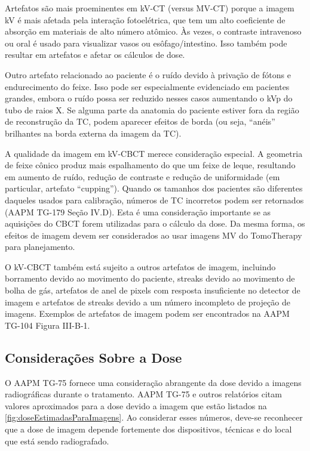 \documentclass[11pt,a4paper]{article}
\begin{document}
    Artefatos são mais proeminentes em kV-CT (versus MV-CT) porque a imagem kV é mais afetada pela interação fotoelétrica, que tem um alto coeficiente de absorção em materiais de alto número atômico. Às vezes, o contraste intravenoso ou oral é usado para visualizar vasos ou esôfago/intestino. Isso também pode resultar em artefatos e afetar os cálculos de dose. 
    
    Outro artefato relacionado ao paciente é o ruído devido à privação de fótons e endurecimento do feixe. Isso pode ser especialmente evidenciado em pacientes grandes, embora o ruído possa ser reduzido nesses casos aumentando o kVp do tubo de raios X. Se alguma parte da anatomia do paciente estiver fora da região de reconstrução da TC, podem aparecer efeitos de borda (ou seja, “anéis” brilhantes na borda externa da imagem da TC).

    A qualidade da imagem em kV-CBCT merece consideração especial. A geometria de feixe cônico produz mais espalhamento do que um feixe de leque, resultando em aumento de ruído, redução de contraste e redução de uniformidade (em particular, artefato “cupping”). Quando os tamanhos dos pacientes são diferentes daqueles usados para calibração, números de TC incorretos podem ser retornados (AAPM TG-179 Seção IV.D). Esta é uma consideração importante se as aquisições do CBCT forem utilizadas para o cálculo da dose. Da mesma forma, os efeitos de imagem devem ser considerados ao usar imagens MV do TomoTherapy para planejamento.

    O kV-CBCT também está sujeito a outros artefatos de imagem, incluindo borramento devido ao movimento do paciente, streaks devido ao movimento de bolha de gás, artefatos de anel de pixels com resposta insuficiente no detector de imagem e artefatos de streaks devido a um número incompleto de projeção de imagens. Exemplos de artefatos de imagem podem ser encontrados na AAPM TG-104 Figura III-B-1.

\subsection*{Considerações Sobre a Dose}

    O AAPM TG-75 fornece uma consideração abrangente da dose devido a imagens radiográficas durante o tratamento. AAPM TG-75 e outros relatórios citam valores aproximados para a dose devido a imagem que estão listados na \ref{fig:doseEstimadasParaImagens}. Ao considerar esses números, deve-se reconhecer que a dose de imagem depende fortemente dos dispositivos, técnicas e do local que está sendo radiografado.
\end{document}

